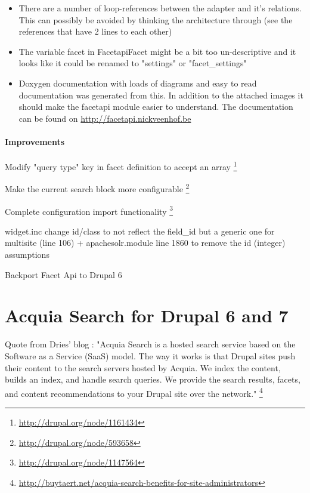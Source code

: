 \begin{itemize}
\item There are a number of loop-references between the adapter and it's relations. This can possibly be avoided by thinking the architecture through (see the references that have 2 lines to each other)
\item The variable facet in FacetapiFacet might be a bit too un-descriptive and it looks like it could be renamed to "settings" or "facet\_settings"
\item Doxygen documentation with loads of diagrams and easy to read documentation was generated from this. In addition to the attached images it should make the facetapi module easier to understand. The documentation can be found on \url{http://facetapi.nickveenhof.be}
\end{itemize}

\paragraph{Improvements}
\begin{packed_itemize}
\item Modify "query type" key in facet definition to accept an array \footnote{\url{http://drupal.org/node/1161434}}
\item Make the current search block more configurable \footnote{\url{http://drupal.org/node/593658}}
\item Complete configuration import functionality \footnote{\url{http://drupal.org/node/1147564}}
\item widget.inc change id/class to not reflect the field\_id but a generic one for multisite (line 106) + apachesolr.module line 1860 to remove the id (integer) assumptions
\item Backport Facet Api to Drupal 6
\end{packed_itemize}

\section{Acquia Search for Drupal 6 and 7}
Quote from Dries' blog : "Acquia Search is a hosted search service based on the Software as a Service (SaaS) model. The way it works is that Drupal sites push their content to the search servers hosted by Acquia. We index the content, builds an index, and handle search queries. We provide the search results, facets, and content recommendations to your Drupal site over the network." \footnote{\url{http://buytaert.net/acquia-search-benefits-for-site-administrators}}

